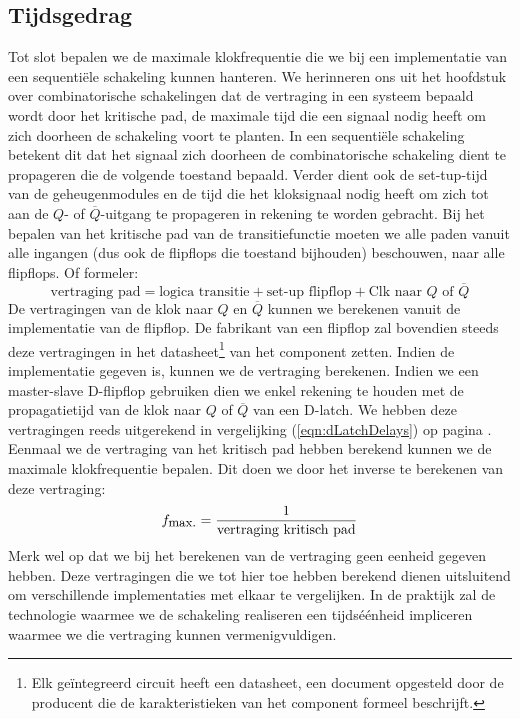 \subsection{Tijdsgedrag}
\label{ss:timeBehaviorSeqSync}
Tot slot bepalen we de maximale klokfrequentie die we bij een implementatie van een sequenti\"ele schakeling kunnen hanteren. We herinneren ons uit het hoofdstuk over combinatorische schakelingen dat de vertraging in een systeem bepaald wordt door het kritische pad, de maximale tijd die een signaal nodig heeft om zich doorheen de schakeling voort te planten. In een sequenti\"ele schakeling betekent dit dat het signaal zich doorheen de combinatorische schakeling dient te propageren die de volgende toestand bepaald. Verder dient ook de set-tup-tijd van de geheugenmodules en de tijd die het kloksignaal nodig heeft om zich tot aan de $Q$- of $\overline{Q}$-uitgang te propageren in rekening te worden gebracht. Bij het bepalen van het kritische pad van de transitiefunctie moeten we alle paden vanuit alle ingangen (dus ook de flipflops die toestand bijhouden) beschouwen, naar alle flipflops. Of formeler:
\begin{equation}
\mbox{vertraging pad}=\mbox{logica transitie}+\mbox{set-up flipflop}+\mbox{Clk naar $Q$ of $\overline{Q}$}
\end{equation}
De vertragingen van de klok naar $Q$ en $\overline{Q}$ kunnen we berekenen vanuit de implementatie van de flipflop. De fabrikant van een flipflop zal bovendien steeds deze vertragingen in het datasheet\footnote{Elk ge\"integreerd circuit heeft een datasheet, een document opgesteld door de producent die de karakteristieken van het component formeel beschrijft.} van het component zetten. Indien de implementatie gegeven is, kunnen we de vertraging berekenen. Indien we een master-slave D-flipflop gebruiken dien we enkel rekening te houden met de propagatietijd van de klok naar $Q$ of $\overline{Q}$ van een D-latch. We hebben deze vertragingen reeds uitgerekend in vergelijking (\ref{eqn:dLatchDelays}) op pagina \pageref{eqn:dLatchDelays}. Eenmaal we de vertraging van het kritisch pad hebben berekend kunnen we de maximale klokfrequentie bepalen. Dit doen we door het inverse te berekenen van deze vertraging:
\begin{equation}
f_{\mbox{\small{max.}}}=\displaystyle\frac{1}{\mbox{vertraging kritisch pad}}
\end{equation}
Merk wel op dat we bij het berekenen van de vertraging geen eenheid gegeven hebben. Deze vertragingen die we tot hier toe hebben berekend dienen uitsluitend om verschillende implementaties met elkaar te vergelijken. In de praktijk zal de technologie waarmee we de schakeling realiseren een tijds\'e\'enheid impliceren waarmee we die vertraging kunnen vermenigvuldigen.

